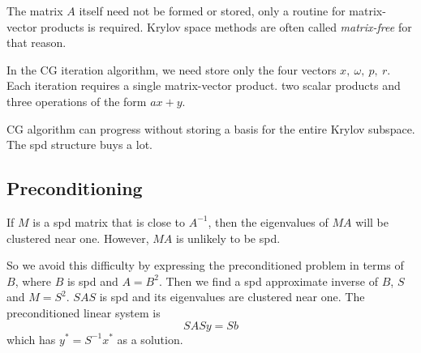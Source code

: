 \begin{rmk}
  The matrix $A$ itself need not be formed or stored, only a routine
  for matrix-vector products is required. Krylov space methods are
  often called \emph{matrix-free} for that reason.
\end{rmk}

\begin{rmk}
  In the CG iteration algorithm, we need store only the four vectors
  $x,\ \omega,\ p,\ r$. Each iteration requires a single matrix-vector
  product. two scalar products and three operations of the form $ax+y$.
\end{rmk}

\begin{rmk}
  CG algorithm can progress without storing a basis for the entire
  Krylov subspace. The spd structure buys a lot.
\end{rmk}

\subsection{Preconditioning}
\label{sec:2.5}

\begin{rmk}
  If $M$ is a spd matrix that is close
  to $A^{-1}$, then the eigenvalues of $MA$ will be clustered near
  one. However, $MA$ is unlikely to be spd.

  So we avoid this
  difficulty by expressing the preconditioned problem in terms of $B$,
  where $B$ is spd and $A=B^2$. Then we find a spd approximate inverse
  of $B$, $S$ and $M=S^2$. $SAS$ is spd and its eigenvalues are clustered near
  one. The preconditioned linear system is $$SASy=Sb$$
  which has $y^*=S^{-1}x^*$ as a solution.
\end{rmk}

